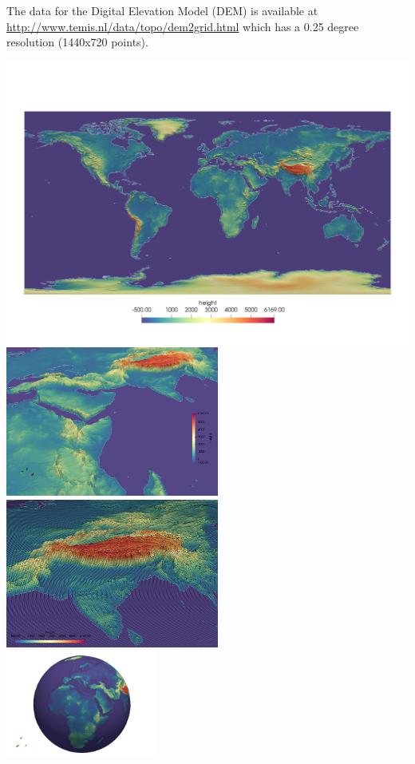 The data for the Digital Elevation Model (DEM) 
is available at \url{http://www.temis.nl/data/topo/dem2grid.html}
which has a 0.25 degree resolution (1440x720 points).

\begin{center}
\includegraphics[width=14cm]{python_codes/fieldstone_69/topo/topo.png}\\
\includegraphics[width=7cm]{python_codes/fieldstone_69/topo/topo2.png}
\includegraphics[width=7cm]{python_codes/fieldstone_69/topo/topo3.png}\\
\includegraphics[width=5cm]{python_codes/fieldstone_69/topo/topo3D_1.png}

\end{center}
